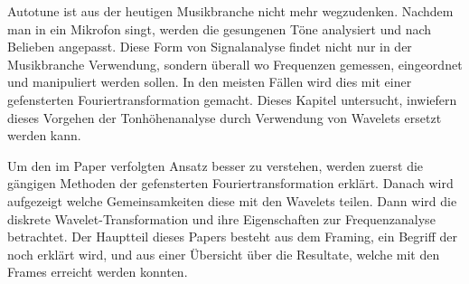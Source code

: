 Autotune ist aus der heutigen Musikbranche nicht mehr wegzudenken. Nachdem man in ein Mikrofon singt, werden die gesungenen Töne analysiert und nach Belieben angepasst. Diese Form von Signalanalyse findet nicht nur in der Musikbranche Verwendung, sondern überall wo Frequenzen gemessen, eingeordnet und manipuliert werden sollen. In den meisten Fällen wird dies mit einer gefensterten Fouriertransformation gemacht. Dieses Kapitel untersucht, inwiefern dieses Vorgehen der Tonhöhenanalyse durch Verwendung von Wavelets ersetzt werden kann.

Um den im Paper verfolgten Ansatz besser zu verstehen, werden zuerst die gängigen Methoden der gefensterten Fouriertransformation erklärt. Danach wird aufgezeigt welche Gemeinsamkeiten diese mit den Wavelets teilen. Dann wird die diskrete Wavelet-Transformation und ihre Eigenschaften zur Frequenzanalyse betrachtet. Der Hauptteil dieses Papers besteht aus dem Framing, ein Begriff der noch erklärt wird, und aus einer Übersicht über die Resultate, welche mit den Frames erreicht werden konnten. 
